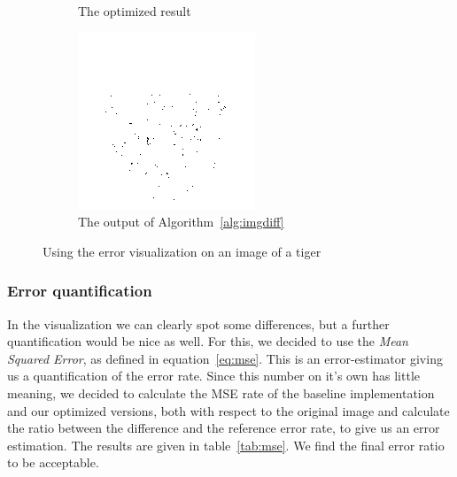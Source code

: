 \begin{figure}
\begin{subfigure}[b]{0.3\textwidth}
            \caption{The optimized result}
            \label{fig:er_tiger_out}
    \end{subfigure}
    \begin{subfigure}[b]{0.3\textwidth}
            \includegraphics[width=\textwidth]{images/tiger_diff}
            \caption{The output of Algorithm~\ref{alg:imgdiff}}
            \label{fig:er_tiger_diff}
    \end{subfigure}
    \caption{Using the error visualization on an image of a tiger}
    \label{fig:imgdiff}
\end{figure}

\subsubsection{Error quantification}
In the visualization we can clearly spot some differences, but a further quantification would be nice as well. For this, we decided to use the \emph{Mean Squared Error}, as defined in equation~\ref{eq:mse}. This is an error-estimator giving us a quantification of the error rate. Since this number on it's own has little meaning, we decided to calculate the MSE rate of the baseline implementation and our optimized versions, both with respect to the original image and calculate the ratio between the difference and the reference error rate, to give us an error estimation. The results are given in table~\ref{tab:mse}. We find the final error ratio to be acceptable.

